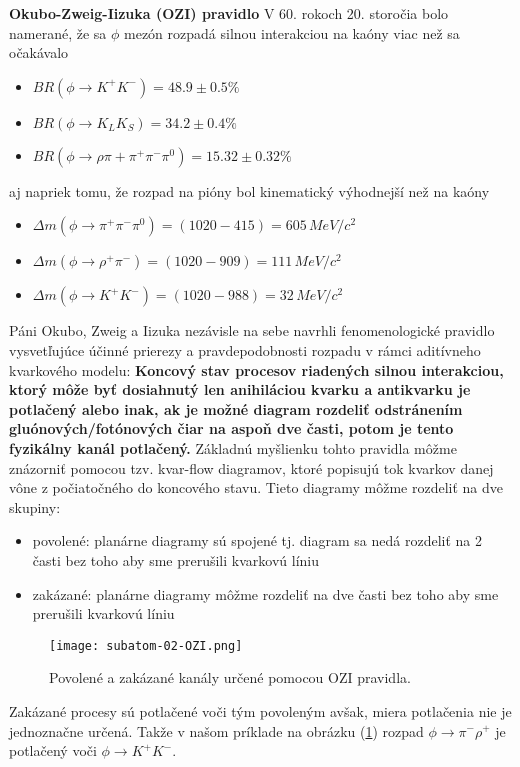 \documentclass[../../main.tex]{subfiles}
\begin{document}
\textbf{Okubo-Zweig-Iizuka (OZI) pravidlo}\newline
V 60. rokoch 20. storočia bolo namerané, že sa $\phi$ mezón rozpadá silnou interakciou na kaóny viac než sa očakávalo
\begin{itemize}
\item $BR(\phi \rightarrow K^+K^-) = 48.9 \pm 0.5 \%$
\item $BR(\phi \rightarrow K_LK_S) = 34.2 \pm 0.4 \%$
\item $BR(\phi \rightarrow \rho \pi+\pi^+ \pi^- \pi^0) = 15.32 \pm 0.32 \%$
\end{itemize}
aj napriek tomu, že rozpad na pióny bol kinematický výhodnejší než na kaóny
\begin{itemize}
\item $\Delta m(\phi \rightarrow \pi^{+} \pi^{-} \pi^{0})= (1020-415) = 605\,MeV/c^{2}$
\item $\Delta m(\phi \rightarrow \rho^{+} \pi^{-})= (1020-909) = 111\,MeV/c^2$
\item $\Delta m(\phi \rightarrow K^{+} K^{-})= (1020-988) = 32\,MeV/c^2$
\end{itemize}
Páni Okubo, Zweig a Iizuka nezávisle na sebe navrhli fenomenologické pravidlo vysvetľujúce účinné prierezy a pravdepodobnosti rozpadu v rámci aditívneho kvarkového modelu: \textbf{Koncový stav procesov riadených silnou interakciou, ktorý môže byť dosiahnutý len anihiláciou kvarku a antikvarku je potlačený alebo inak, ak je možné diagram rozdeliť odstránením gluónových/fotónových čiar na aspoň dve časti, potom je tento fyzikálny kanál potlačený.}
Základnú myšlienku tohto pravidla môžme znázorniť pomocou tzv. kvar-flow diagramov, ktoré popisujú tok kvarkov danej vône z počiatočného do koncového stavu. Tieto diagramy môžme rozdeliť na dve skupiny:
\begin{itemize}
\item povolené: planárne diagramy sú spojené tj. diagram sa nedá rozdeliť na 2 časti bez toho aby sme prerušili kvarkovú líniu
\item zakázané: planárne diagramy môžme rozdeliť na dve časti bez toho aby sme prerušili kvarkovú líniu
\end{itemize}

\begin{figure}[!h]
\texttt{[image: subatom-02-OZI.png]}
\centering
\caption{Povolené a zakázané kanály určené pomocou OZI pravidla.}
\label{sf2:fig:OZI}
\end{figure}

Zakázané procesy sú potlačené voči tým povoleným avšak, miera potlačenia nie je jednoznačne určená. Takže v našom príklade na obrázku (\ref{sf2:fig:OZI}) rozpad $\phi \rightarrow \pi^{-} \rho^{+}$ je potlačený voči $\phi \rightarrow K^{+} K^{-}$.\newline
\end{document}
